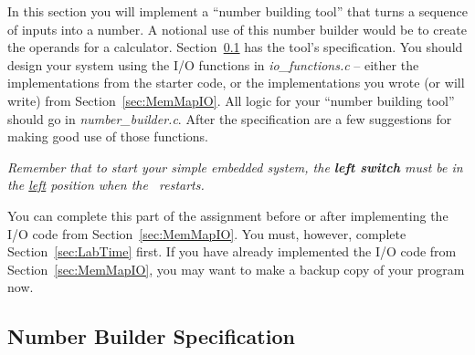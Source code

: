 In this section you will implement a ``number building tool'' that turns a sequence of inputs into a number.
A notional use of this number builder would be to create the operands for a calculator.
Section~\ref{subsec:functionalspecification} has the tool's specification.
You should design your system using the I/O functions in \textit{io\_functions.c} -- either the implementations from the starter code, or the implementations you wrote (or will write) from Section~\ref{sec:MemMapIO}.
All logic for your ``number building tool'' should go in \textit{number\_builder.c}.
After the specification are a few suggestions for making good use of those functions.

\textit{Remember that to start your simple embedded system, the \textbf{left switch} must be in the \underline{left} position when the \developmentboard\ restarts.}

You can complete this part of the assignment before or after implementing the I/O code from Section~\ref{sec:MemMapIO}.
You must, however, complete Section~\ref{sec:LabTime} first.
If you have already implemented the I/O code from Section~\ref{sec:MemMapIO}, you may want to make a backup copy of your program now.


\subsection{Number Builder Specification} \label{subsec:functionalspecification}

